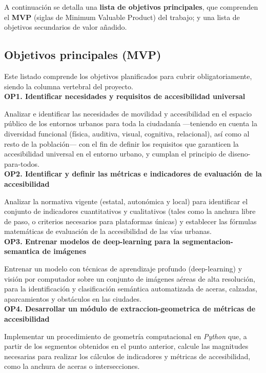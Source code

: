 A continuación se detalla una \textbf{lista de objetivos principales}, que comprenden el \textbf{\gls{MVP}} (siglas de Minimum Valuable Product) del trabajo; y una lista de objetivos secundarios de valor añadido.

\subsection{Objetivos principales (MVP)}

Este listado comprende los objetivos planificados para cubrir obligatoriamente, siendo la columna vertebral del proyecto.
\\

\textbf{OP1. Identificar necesidades y requisitos de accesibilidad universal}

Analizar e identificar las necesidades de movilidad y accesibilidad en el espacio público de los entornos urbanos para toda la ciudadanía —teniendo en cuenta la diversidad funcional (física, auditiva, visual, cognitiva, relacional), así como al resto de la población— con el fin de definir los requisitos que garanticen la accesibilidad universal en el entorno urbano, y cumplan el principio de \gls{diseno-para-todos}.
\\

\textbf{OP2. Identificar y definir las métricas e indicadores de evaluación de la accesibilidad}

Analizar la normativa vigente (estatal, autonómica y local) para identificar el conjunto de indicadores cuantitativos y cualitativos (tales como la anchura libre de paso, o criterios necesarios para plataformas únicas) y establecer las fórmulas matemáticas de evaluación de la accesibilidad de las vías urbanas.
\\

\textbf{OP3. Entrenar modelos de \gls{deep-learning} para la \gls{segmentacion-semantica} de imágenes}

Entrenar un modelo con técnicas de aprendizaje profundo (\gls{deep-learning}) y visión por computador sobre un conjunto de imágenes aéreas de alta resolución, para la identificación y clasificación semántica automatizada de aceras, calzadas, aparcamientos y obstáculos en las ciudades.
\\

\textbf{OP4. Desarrollar un módulo de \gls{extraccion-geometrica} de métricas de accesibilidad}

Implementar un procedimiento de geometría computacional en \textit{Python} que, a partir de los segmentos obtenidos en el punto anterior, calcule las magnitudes necesarias para realizar los cálculos de indicadores y métricas de accesibilidad, como la anchura de aceras o intersecciones.
\\


